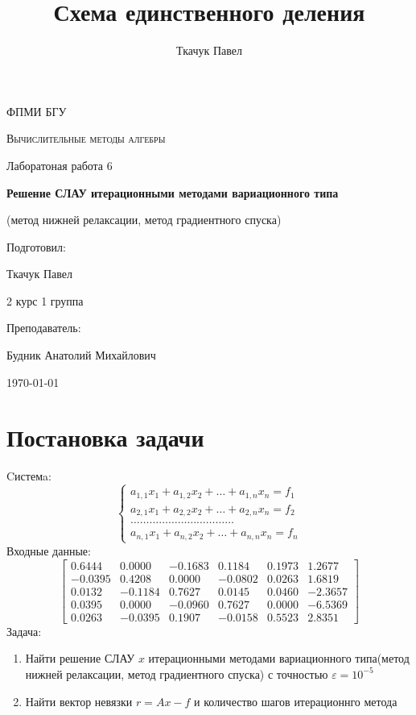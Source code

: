\documentclass[11.4pt]{article}
\author{Ткачук Павел}
\title{Схема единственного деления}
\begin{document}
	\begin{titlepage}
		
		\centering
		{\scshape\LARGE ФПМИ БГУ \par}
		\vfill
		\begin{flushleft}
		{\scshape\Large Вычислительные методы алгебры\par Лаборатоная работа 6 \par}
		\vspace{1cm}
		{\huge\bfseries Решение СЛАУ итерационными методами вариационного типа\par}
		{\large (метод нижней релаксации, метод градиентного спуска)}
		\end{flushleft}
		\vspace{10cm}
		\begin{flushright}
		\large
		Подготовил:\par
		Ткачук Павел\par
		2 курс 1 группа\par
		\vspace{0.5cm}
		Преподаватель:\par
		Будник Анатолий Михайлович
		\end{flushright}
		
		\vfill
		{\large \today}
	\end{titlepage}
\section{Постановка задачи}
	Cистемa:
	\begin{equation}\label{first}
		\left\{
			\begin{array}{c}
				a_{1,1} x_1 + a_{1,2} x_2 + \ldots + a_{1,n} x_n = f_1  \\
				a_{2,1} x_1 + a_{2,2} x_2 + \ldots + a_{2,n} x_n = f_2  \\
				\dots\dots\dots\dots\dots\dots\dots\dots\dots\dots\dots  \\
				a_{n,1} x_1 + a_{n,2} x_2 + \ldots + a_{n,n} x_n = f_n  
			\end{array}
		\right.
	\end{equation}
	Входные данные:
	\[
		\left[
			\begin{array}{ccccc|c}
				0.6444 & 0.0000 & -0.1683 & 0.1184 & 0.1973 & 1.2677\\
				-0.0395 & 0.4208 & 0.0000 & -0.0802 & 0.0263 & 1.6819\\
				0.0132  & -0.1184 & 0.7627 & 0.0145 & 0.0460 & -2.3657\\
				0.0395 & 0.0000 & -0.0960 & 0.7627 & 0.0000 & -6.5369\\
				0.0263 & -0.0395 & 0.1907 & -0.0158 & 0.5523 & 2.8351
			\end{array}
		\right]
	\]
	Задача:
	\begin{enumerate}
		\item Найти решение СЛАУ $x$ итерационными методами вариационного типа(метод нижней релаксации, метод градиентного спуска) с точностью $\varepsilon=10^{-5}$
		\item Найти вектор невязки $r = Ax-f$ и количество шагов итерационнго метода
	\end{enumerate}
\end{document}
